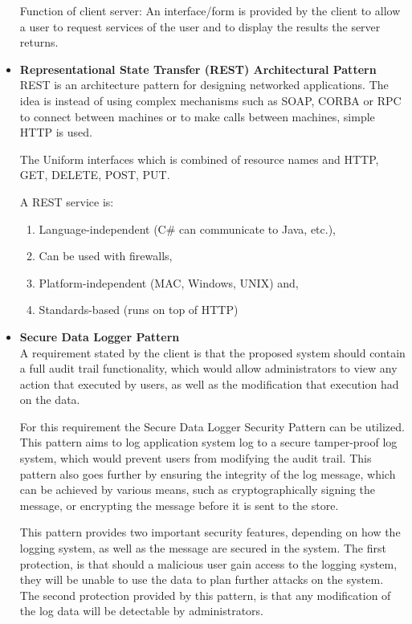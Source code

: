 \documentclass[a4paper,10pt]{article}
\begin{document}
\begin{itemize}
				Function of client server: An interface/form is provided by the client to allow a user to request services of the user and to display the results the server returns.

		\item \textbf{Representational State Transfer (REST) Architectural Pattern}\\
				REST is an architecture pattern for designing networked applications. The idea is instead of using complex mechanisms such as SOAP, CORBA or RPC to connect between machines or to make calls between machines, simple HTTP is used.

				The Uniform interfaces which is combined of resource names and HTTP, GET, DELETE, POST, PUT.

				A REST service is:
				\begin{enumerate}
					\item Language-independent (C\# can communicate to Java, etc.),
					\item Can be used with firewalls,
					\item Platform-independent (MAC, Windows, UNIX) and,
					\item Standards-based (runs on top of HTTP)
				\end{enumerate}

		\item \textbf{Secure Data Logger Pattern} \\
				A requirement stated by the client is that the proposed system should contain a full audit trail functionality, which would allow administrators to view any action that executed by users, as well as the modification that execution had on the data.

				For this requirement the Secure Data Logger Security Pattern can be utilized. This pattern aims to log application system log to a secure tamper-proof log system, which would prevent users from modifying the audit trail. This pattern also goes further by ensuring the integrity of the log message, which can be achieved by various means, such as cryptographically signing the message, or encrypting the message before it is sent to the store.

				This pattern provides two important security features, depending on how the logging system, as well as the message are secured in the system.  The first protection, is that should a malicious user gain access to the logging system, they will be unable to use the data to plan further attacks on the system.  The second protection provided by this pattern, is that any modification of the log data will be detectable by administrators.

	\end{itemize}
\end{document}
